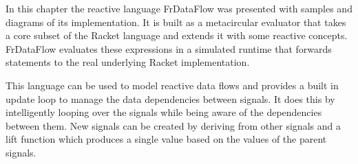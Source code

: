 In this chapter the reactive language FrDataFlow was presented with samples and diagrams of its implementation.
It is built as a metacircular evaluator that takes a core subset of the Racket language and extends it with some reactive concepts. FrDataFlow evaluates these expressions in a simulated runtime that forwards statements to the real underlying Racket implementation. 

This language can be used to model reactive data flows and provides a built in update loop to manage the data dependencies between signals. It does this by intelligently looping over the signals while being aware of the dependencies between them. New signals can be created by deriving from other signals and a lift function which produces a single value based on the values of the parent signals.